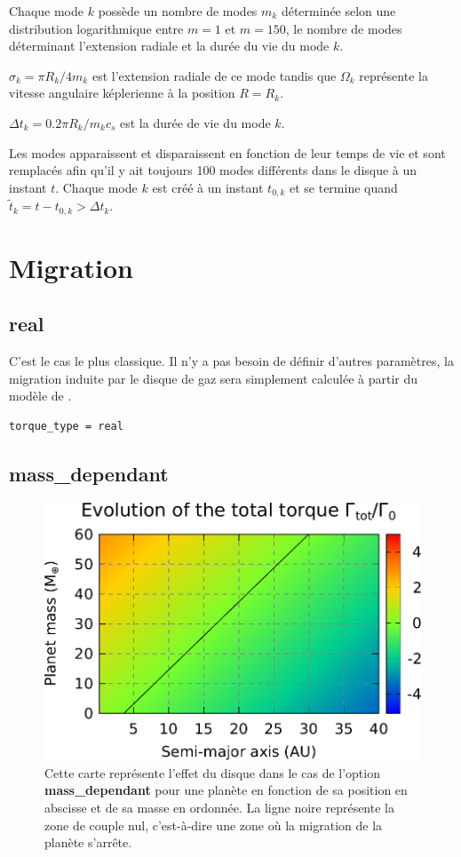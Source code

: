 Chaque mode $k$ possède un nombre de modes $m_k$ déterminée selon une distribution logarithmique entre $m=1$ et $m=150$, le nombre de modes déterminant l'extension radiale et la durée du vie du mode $k$.

$\sigma_k = \pi R_k / 4m_k$ est l'extension radiale de ce mode tandis que $\Omega_k$ représente la vitesse angulaire képlerienne à la position $R=R_k$.

$\Delta t_k=0.2\pi R_k / m_k c_s$ est la durée de vie du mode $k$. 

\bigskip

Les modes apparaissent et disparaissent en fonction de leur temps de vie et sont remplacés afin qu'il y ait toujours 100 modes différents dans le disque à un instant $t$. Chaque mode $k$ est créé à un instant $t_{0,k}$ et se termine quand $\tilde{t}_k = t-t_{0,k} > \Delta t_k$.

\section{Migration}
\subsection{real}
C'est le cas le plus classique. Il n'y a pas besoin de définir d'autres paramètres, la migration induite par le disque de gaz sera simplement calculée à partir du modèle de \cite{paardekooper2011torque}.

\begin{verbatim}
torque_type = real
\end{verbatim}

\subsection{mass\_dependant}\label{sec:mass_dependant}
\begin{figure}[htbp]
\centering
\includegraphics[width=0.65\linewidth]{figure/migration_map/mass_dependant.pdf}
\caption[Carte de migration correspondant à une zone de convergence \textbf{mass\_dependant}.]{Cette carte représente
l'effet du disque dans le cas de l'option \textbf{mass\_dependant} pour une planète en fonction de sa position en abscisse et de
sa masse en ordonnée. La ligne noire représente la zone de couple nul, c'est-à-dire une zone où la migration de la planète
s'arrête.}
\end{figure}

